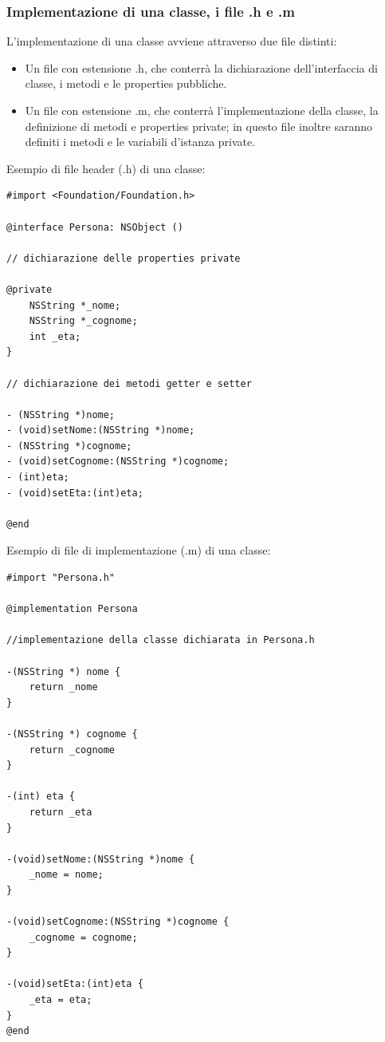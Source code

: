 \subsubsection{Implementazione di una classe, i file .h e .m}
L'implementazione di una classe avviene attraverso due file distinti:
\begin{itemize}
\item Un file con estensione .h, che conterrà la dichiarazione dell'interfaccia di classe, i metodi e le properties pubbliche.
\item Un file con estensione .m, che conterrà l'implementazione della classe, la definizione di metodi e properties private; in questo file inoltre saranno definiti i metodi e le variabili d'istanza private.
\end{itemize}
Esempio di file header (.h) di una classe:
\lstset{language=[Objective]C, breakindent=40pt, breaklines}
\begin{lstlisting}
#import <Foundation/Foundation.h>

@interface Persona: NSObject ()

// dichiarazione delle properties private 

@private
	NSString *_nome;
	NSString *_cognome;
	int _eta; 
}

// dichiarazione dei metodi getter e setter

- (NSString *)nome;
- (void)setNome:(NSString *)nome;
- (NSString *)cognome;
- (void)setCognome:(NSString *)cognome;
- (int)eta;
- (void)setEta:(int)eta;

@end
\end{lstlisting}
\bigskip
\bigskip
\bigskip
Esempio di file di implementazione (.m) di una classe:
\lstset{language=[Objective]C, breakindent=40pt, breaklines}
\begin{lstlisting}
#import "Persona.h" 

@implementation Persona

//implementazione della classe dichiarata in Persona.h
 
-(NSString *) nome {
	return _nome
}

-(NSString *) cognome {
	return _cognome
}

-(int) eta {
	return _eta
}

-(void)setNome:(NSString *)nome {
	_nome = nome;
}

-(void)setCognome:(NSString *)cognome {
	_cognome = cognome;
}

-(void)setEta:(int)eta {
	_eta = eta;
}
@end
\end{lstlisting}
